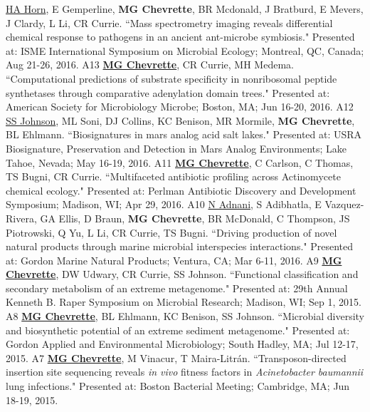 \begin{cvpubs}
  \cvpub
    {\underline{HA Horn}, E Gemperline, \textbf{MG Chevrette}, BR Mcdonald, J Bratburd, E Mevers, J Clardy, L Li, CR Currie. ``Mass spectrometry imaging reveals differential chemical response to pathogens in an ancient ant-microbe symbiosis." Presented at: ISME International Symposium on Microbial Ecology; Montreal, QC, Canada; Aug 21-26, 2016.} %
    {A13} %
  \cvpub
    {\textbf{\underline{MG Chevrette}}, CR Currie, MH Medema.  ``Computational predictions of substrate specificity in nonribosomal peptide synthetases through comparative adenylation domain trees." Presented at: American Society for Microbiology Microbe; Boston, MA; Jun 16-20, 2016.} %
    {A12} %
  \cvpub
    {\underline{SS Johnson}, ML Soni, DJ Collins, KC Benison, MR Mormile, \textbf{MG Chevrette}, BL Ehlmann. ``Biosignatures in mars analog acid salt lakes." Presented at: USRA Biosignature, Preservation and Detection in Mars Analog Environments; Lake Tahoe, Nevada; May 16-19, 2016.} %
    {A11} %
  \cvpub
    {\textbf{\underline{MG Chevrette}}, C Carlson, C Thomas, TS Bugni, CR Currie. ``Multifaceted antibiotic profiling across Actinomycete chemical ecology." Presented at: Perlman Antibiotic Discovery and Development Symposium; Madison, WI; Apr 29, 2016.} %
    {A10} %
  \cvpub
    {\underline{N Adnani}, S Adibhatla, E Vazquez-Rivera, GA Ellis, D Braun, \textbf{MG Chevrette}, BR McDonald, C Thompson, JS Piotrowski, Q Yu, L Li, CR Currie, TS Bugni. ``Driving production of novel natural products through marine microbial interspecies interactions." Presented at: Gordon Marine Natural Products; Ventura, CA; Mar 6-11, 2016.} %
    {A9} %
  \cvpub
    {\textbf{\underline{MG Chevrette}}, DW Udwary, CR Currie, SS Johnson. ``Functional classification and secondary metabolism of an extreme metagenome." Presented at: 29th Annual Kenneth B. Raper Symposium on Microbial Research; Madison, WI; Sep 1, 2015.} %
    {A8} %
  \cvpub
    {\textbf{\underline{MG Chevrette}}, BL Ehlmann, KC Benison, SS Johnson. ``Microbial diversity and biosynthetic potential of an extreme sediment metagenome." Presented at: Gordon Applied and Environmental Microbiology; South Hadley, MA; Jul 12-17, 2015.} %
    {A7} %
  \cvpub
    {\textbf{\underline{MG Chevrette}}, M Vinacur, T Maira-Litr\'{a}n. ``Transposon-directed insertion site sequencing reveals \textit{in vivo} fitness factors in \textit{Acinetobacter baumannii} lung infections." Presented at: Boston Bacterial Meeting; Cambridge, MA; Jun 18-19, 2015.} %

\end{cvpubs}
